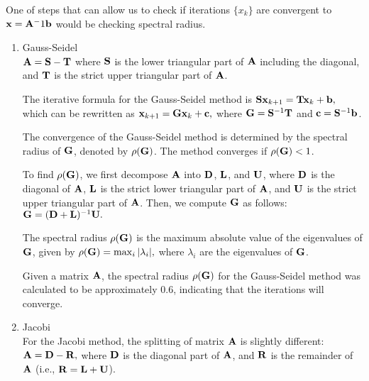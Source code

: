 
One of steps that can allow us to check if iterations $\{x_k\}$ are convergent to $\mathbf{x} = \mathbf{A}^-1\mathbf{b}$ would be checking spectral radius.


\begin{enumerate}
  \item Gauss-Seidel\\
    
    $ \mathbf{A} = \mathbf{S} - \mathbf{T} $
    where $ \mathbf{S} $ is the lower triangular part of $ \mathbf{A} $ including the diagonal, and $ \mathbf{T} $ is the strict upper triangular part of $ \mathbf{A} $.

    The iterative formula for the Gauss-Seidel method is
    $ \mathbf{Sx}_{k+1} = \mathbf{Tx}_k + \mathbf{b}, $
    which can be rewritten as
    $ \mathbf{x}_{k+1} = \mathbf{Gx}_k + \mathbf{c}, $
    where $ \mathbf{G} = \mathbf{S}^{-1}\mathbf{T} $ and $ \mathbf{c} = \mathbf{S}^{-1}\mathbf{b} $.

    The convergence of the Gauss-Seidel method is determined by the spectral radius of $ \mathbf{G} $, denoted by $ \rho(\mathbf{G}) $. The method converges if $ \rho(\mathbf{G}) < 1 $.

    To find $ \rho(\mathbf{G}) $, we first decompose $ \mathbf{A} $ into $ \mathbf{D} $, $ \mathbf{L} $, and $ \mathbf{U} $, where $ \mathbf{D} $ is the diagonal of $ \mathbf{A} $, $ \mathbf{L} $ is the strict lower triangular part of $ \mathbf{A} $, and $ \mathbf{U} $ is the strict upper triangular part of $ \mathbf{A} $. Then, we compute $ \mathbf{G} $ as follows:
    $ \mathbf{G} = (\mathbf{D} + \mathbf{L})^{-1}\mathbf{U}. $

    The spectral radius $ \rho(\mathbf{G}) $ is the maximum absolute value of the eigenvalues of $ \mathbf{G} $, given by
    $ \rho(\mathbf{G}) = \max_i |\lambda_i|, $
    where $ \lambda_i $ are the eigenvalues of $ \mathbf{G} $.

    Given a matrix $ \mathbf{A} $, the spectral radius $ \rho(\mathbf{G}) $ for the Gauss-Seidel method was calculated to be approximately 0.6, indicating that the iterations will converge.
  
  \item Jacobi \\
    For the Jacobi method, the splitting of matrix $ \mathbf{A} $ is slightly different:
    $ \mathbf{A} = \mathbf{D} - \mathbf{R}, $
    where $ \mathbf{D} $ is the diagonal part of $ \mathbf{A} $, and $ \mathbf{R} $ is the remainder of $ \mathbf{A} $ (i.e., $ \mathbf{R} = \mathbf{L} + \mathbf{U} $).


\end{enumerate}

